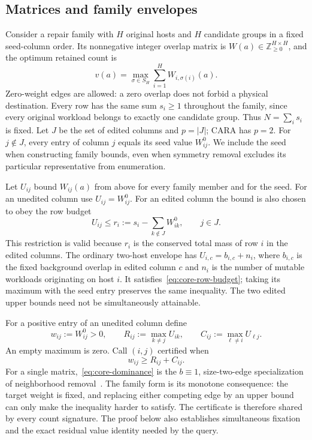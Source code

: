 \documentclass[11pt]{article}
\begin{document}
\subsection{Matrices and family envelopes}
Consider a repair family with $H$ original hosts and $H$ candidate groups in a fixed seed-column order. Its nonnegative integer overlap matrix is $W(a)\in\mathbb Z_{\ge0}^{H\times H}$, and the optimum retained count is
\begin{equation}\label{eq:core-value}
v(a)=\max_{\sigma\in S_H}\sum_{i=1}^H W_{i,\sigma(i)}(a).
\end{equation}
Zero-weight edges are allowed: a zero overlap does not forbid a physical destination. Every row has the same sum $s_i\ge1$ throughout the family, since every original workload belongs to exactly one candidate group. Thus $N=\sum_i s_i$ is fixed. Let $J$ be the set of edited columns and $p=|J|$; CARA has $p=2$. For $j\notin J$, every entry of column $j$ equals its seed value $W^0_{ij}$. We include the seed when constructing family bounds, even when symmetry removal excludes its particular representative from enumeration.

Let $U_{ij}$ bound $W_{ij}(a)$ from above for every family member and for the seed. For an unedited column use $U_{ij}=W^0_{ij}$. For an edited column the bound is also chosen to obey the row budget
\begin{equation}\label{eq:core-row-budget}
U_{ij}\le r_i:=s_i-\sum_{k\notin J}W^0_{ik},\qquad j\in J.
\end{equation}
This restriction is valid because $r_i$ is the conserved total mass of row $i$ in the edited columns. The ordinary two-host envelope has $U_{i,c}=b_{i,c}+n_i$, where $b_{i,c}$ is the fixed background overlap in edited column $c$ and $n_i$ is the number of mutable workloads originating on host $i$. It satisfies~\eqref{eq:core-row-budget}; taking its maximum with the seed entry preserves the same inequality. The two edited upper bounds need not be simultaneously attainable.

For a positive entry of an unedited column define
\begin{equation}\label{eq:core-certificate}
w_{ij}:=W^0_{ij}>0,\qquad R_{ij}:=\max_{k\ne j}U_{ik},\qquad C_{ij}:=\max_{\ell\ne i}U_{\ell j}.
\end{equation}
An empty maximum is zero. Call $(i,j)$ certified when
\begin{equation}\label{eq:core-dominance}
w_{ij}\ge R_{ij}+C_{ij}.
\end{equation}
For a single matrix,~\eqref{eq:core-dominance} is the $b\equiv1$, size-two-edge specialization of neighborhood removal~\cite{grossmann2026hypergraph}. The family form is its monotone consequence: the target weight is fixed, and replacing either competing edge by an upper bound can only make the inequality harder to satisfy. The certificate is therefore shared by every count signature. The proof below also establishes simultaneous fixation and the exact residual value identity needed by the query.
\end{document}
